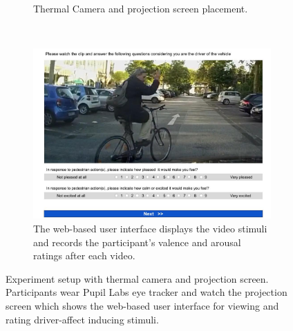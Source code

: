 \documentclass[acmlarge]{acmart}
\begin{document}
\begin{figure}[!htbp]
\begin{subfigure}[t]{0.27\textwidth}
        \caption{Thermal Camera and projection screen placement.}
        \label{fig:projector_setup}
        \end{subfigure}
        ~
        \begin{subfigure}[t]{0.40\textwidth}
        \centering        
        \includegraphics[width=\linewidth]{./images/video_page.jpg}
        \caption{The web-based user interface displays the video stimuli and records the participant's valence and arousal ratings after each video.}
        \label{fig:validation_study_video_page}
        \end{subfigure}
    \caption{Experiment setup with thermal camera and projection screen. Participants wear Pupil Labs eye tracker and watch the projection screen which shows the web-based user interface for viewing and rating driver-affect inducing stimuli.}
    \label{fig:exp_setup}
\end{figure}










\end{document}
